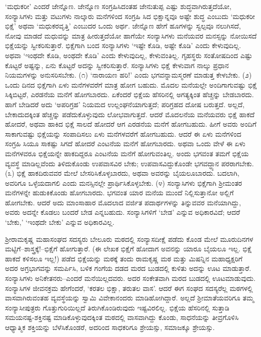‘ಮಧುಕರೀ’ ಎಂದರೆ ಜೇನ್ನೊಣ. ಜೇನ್ನೊಣ ಸಂಗ್ರಹಿಸಿದಂತಹ ಜೇನುತುಪ್ಪ ಎಷ್ಟು ಶುದ್ಧವಾಗಿರುತ್ತದೆಯೋ, ಸಂನ್ಯಾಸಿಗಳು ಮತ್ತು ವಟುಗಳು ನಾಲ್ಕಾರು ಮನೆಗಳಿಂದ ಸಂಗ್ರಹಿ ಸಿದ ಭಿಕ್ಷಾನ್ನವೂ ಅಷ್ಟೇ ಶುದ್ಧ ಎಂಬುದು ‘ಮಧುಕರೀ ಭಿಕ್ಷೆ’ ಅಥವಾ ‘ಮಧುಕರವೃತ್ತಿ’ ಎಂಬುದರ ಒಂದು ಅರ್ಥ. ಜೇನ್ನೊಣ ಹೇಗೆ ಹೂಗಳನ್ನು ಸ್ವಲ್ಪವೂ ನಲುಗಿಸದೆ, ನೋವು ಮಾಡದೆ ಮಧುವನ್ನು ಮಾತ್ರ ಹೀರುತ್ತದೆಯೋ ಹಾಗೆಯೇ ಸಂನ್ಯಾಸಿಗಳು ಮನೆಯವರ ಮನಸ್ಸನ್ನು ನೋಯಿಸದೆ ಭಿಕ್ಷೆಯನ್ನು ಸ್ವೀಕರಿಸುತ್ತಾರೆ. ಭಿಕ್ಷೆಗಾಗಿ ಬಂದ ಸಂನ್ಯಾಸಿಗಳು ‘ಇಷ್ಟೇ ಕೊಡಿ, ಅಷ್ಟೇ ಕೊಡಿ’ ಎಂದು ಕೇಳುವುದಿಲ್ಲ. ಅಥವಾ ‘ಇಂಥದೇ ಕೊಡಿ, ಅಂಥದೇ ಕೊಡಿ’ ಎಂದು ಕೇಳುವುದಿಲ್ಲ, ಕೇಳುವಂತಿಲ್ಲ. ಗೃಹಸ್ಥರು ಸಂತೋಷದಿಂದ ಎಷ್ಟು ಕೊಟ್ಟರೆ ಅಷ್ಟನ್ನು, ಏನು ಕೊಟ್ಟರೆ ಅದನ್ನು ಸ್ವೀಕರಿಸುತ್ತಾರೆ. ಸಂನ್ಯಾಸಿಗಳು ಭಿಕ್ಷೆ ಕೇಳುವಾಗ ನಾಲ್ಕು ಪ್ರಧಾನ ನಿಯಮಗಳನ್ನು ಅನುಸರಿಸಬೇಕು. (೧) ‘ನಾರಾಯಣ ಹರಿ!’ ಎಂದು ಭಗವನ್ನಾಮಸ್ಮರಣೆ ಮಾಡುತ್ತ ಕೇಳಬೇಕು. (೨) ಒಂದು ದಿನದ ಭಿಕ್ಷೆಗಾಗಿ ಏಳು ಮನೆಗಳವರೆಗೆ ಮಾತ್ರ ಹೋಗ ಬಹುದು. ಮೊದಲ ಮನೆಯಲ್ಲೇ ಅಂದಿಗಾಗುವಷ್ಟು ಭಿಕ್ಷೆ ಸಿಕ್ಕಿಬಿಟ್ಟರೆ, ಎರಡನೆಯ ಮನೆಗೆ ಹೋಗಬಾರದು. ಏಕೆಂದರೆ ಭಿಕ್ಷೆಯ ಹೆಸರಿನಲ್ಲಿ ಅಗತ್ಯಕ್ಕಿಂತ ಹೆಚ್ಚನ್ನು ಬೇಡಬಾರದು. ಹಾಗೆ ಬೇಡಿದರೆ ಅದು ‘ಅಪರಿಗ್ರಹ’ ನಿಯಮದ ಉಲ್ಲಂಘನೆಯಾಗುತ್ತದೆ; ಪರಿಗ್ರಹದ ದೋಷ ಬರುತ್ತದೆ. ಅಲ್ಲದೆ, ಬೇಕಾದುದಕ್ಕಿಂತ ಹೆಚ್ಚನ್ನು ಪಡೆದುಕೊಳ್ಳುವುದು ಲೋಭವಾಗುತ್ತದೆ. ಆದರೆ ಮೊದಲನೆಯ ಮನೆಯವರು ಭಿಕ್ಷೆ ಹಾಕದೆ ಹೋದರೆ, ಅಥವಾ ಹಾಕಿದ ಭಿಕ್ಷೆ ಸಾಲದೆ ಹೋದರೆ ಆಗ ಎರಡನೆಯ ಮನೆಗೆ ಹೋಗಬಹುದು. ಹೀಗೆ ಅವರು ಅಂದಿಗೆ ಸಾಕಾಗುವಷ್ಟು ಭಿಕ್ಷೆಯನ್ನು ಸಂಪಾದಿಸಲು ಏಳು ಮನೆಗಳವರೆಗೆ ಹೋಗಬಹುದು. ಆದರೆ ಈ ಏಳು ಮನೆಗಳಿಂದ ಸಂಗ್ರಹಿ ಸಿಯೂ ಸಾಕಷ್ಟು ಸಿಗದೆ ಹೋದರೆ ಎಂಟನೆಯ ಮನೆಗೆ ಹೋಗಬಾರದು. ಅಥವಾ ಒಂದು ವೇಳೆ ಈ ಏಳು ಮನೆಗಳವರೂ ಭಿಕ್ಷೆಯನ್ನೇ ಹಾಕದಿದ್ದರೂ ಎಂಟನೆಯ ಮನೆಗೆ ಹೋಗುವಂತಿಲ್ಲ. ಅಂದು ಭಗವಂತ ತಮಗೆ ಭಿಕ್ಷೆಯ ವ್ಯವಸ್ಥೆ ಮಾಡಿಲ್ಲವೆಂದು ತಿಳಿದುಕೊಂಡು ಉಪವಾಸವಿರ ಬೇಕು; ಉಪವಾಸವಿದ್ದುಕೊಂಡೇ ಭಗವದ್ಧ್ಯಾನ ಪರರಾಗಬೇಕು. (೩) ಭಿಕ್ಷೆ ಹಾಕದಿರುವವರ ಮೇಲೆ ಬೇಸರಿಸಿಕೊಳ್ಳಬಾರದು, ಅಥವಾ ಅವರನ್ನು ಬೈಯಲೂಬಾರದು. ಬದಲಾಗಿ, ಅವರಿಗೂ ಒಳ್ಳೆಯದಾಗಲಿ ಎಂದು ಮನಸ್ಸಿನಲ್ಲೇ ಪ್ರಾರ್ಥಿಸಿಕೊಳ್ಳಬೇಕು. (೪) ಸಂನ್ಯಾಸಿಗಳು ಭಿಕ್ಷೆಗಾಗಿ ಶ್ರೀಮಂತರ ಮನೆಗಳನ್ನೇ ಹುಡುಕಿಕೊಂಡು ಹೋಗಬಾರದು. ಭಗವಂತ ಯಾರ ಮನೆಯ ಮುಂದೆ ನಿಲ್ಲಿಸುತ್ತಾನೋ ಅಲ್ಲಿಗೆ ಹೋಗಬೇಕು. ಆದರೆ ಅದು ಮಾಂಸಾಹಾರ ಮೊದಲಾದ ವರ್ಜಿತ ಪದಾರ್ಥಗಳನ್ನು ತಿನ್ನುವವರ ಮನೆಯಾಗಿದ್ದು, ಅವರು ಅದನ್ನೇ ಕೊಡಲು ಬಂದರೆ ಬೇಡ ಎನ್ನಬಹುದು. ಸಂನ್ಯಾಸಿಗಳಿಗೆ ‘ಬೇಡ’ ಎನ್ನುವ ಅಧಿಕಾರವಿದೆ; ಆದರೆ ‘ಬೇಕು,’ ‘ಇಂಥದೇ ಬೇಕು’ ಎನ್ನುವ ಅಧಿಕಾರವಿಲ್ಲ.

ಶ್ರೀರಾಮಕೃಷ್ಣ ಮಹಾಸಂಘದ ಸದಸ್ಯರು ಬೇಲೂರು ಮಠದಲ್ಲಿ ಸಂನ್ಯಾಸದೀಕ್ಷೆ ಪಡೆದು ಕೊಂಡ ಮೇಲೆ ಮೂರುದಿನಗಳ ಮಟ್ಟಿಗೆ–ಶಾಸ್ತ್ರಕ್ಕೆ!–ಭಿಕ್ಷೆಗೆ ಹೋಗುತ್ತಾರೆ. (ಈ ಲೇಖಕ ಭಿಕ್ಷೆಗೆ ಹೋದಾಗ ಅವನನ್ನು ಯಾರೂ ಬೈಯಲೂ ಇಲ್ಲ. ಭಿಕ್ಷೆ ಹಾಕದೆ ಕಳಿಸಲೂ ಇಲ್ಲ!) ಪಡೆದ ಭಿಕ್ಷೆಯನ್ನು ಮಠಕ್ಕೆ ತಂದು ರಾಮಕೃಷ್ಣ ಮಠ ಮತ್ತು ಮಿಷನ್ನಿನ ಮಹಾಧ್ಯಕ್ಷರಿಗೆ ಅದರ ಅಗ್ರಭಾಗವನ್ನು ಸಮರ್ಪಿಸಿ, ಬಳಿಕ ಗಂಗೆಯ ದಡದ ಮರದ ಬುಡದಲ್ಲಿ ಕುಳಿತು ಅದನ್ನು ಊಟ ಮಾಡುತ್ತಾರೆ. ಸಂನ್ಯಾಸಿಗಳು ಅನಿಕೇತನರು–ಎಂದರೆ ಮನೆಯಿಲ್ಲದವರು. ಅದರ ಸಂಕೇತವಾಗಿ ಮರದ ಬುಡದಲ್ಲಿ ಊಟಮಾಡುವುದು. ಸಂನ್ಯಾಸಿಗಳ ಜೀವನಕ್ರಮ ಹೇಗೆಂದರೆ, ‘ಕರತಲ ಭಿಕ್ಷಾ, ತರುತಲ ವಾಸ’. ಆದರೆ ಈಗ ಸಂಘದ ಸದಸ್ಯರೆಲ್ಲ ಮಠಗಳಲ್ಲಿ ವಾಸವಾಗಿರುವಂತಹ ವ್ಯವಸ್ಥೆಯನ್ನು ಸ್ವಾಮಿ ವಿವೇಕಾನಂದರು ಮಾಡಿಹೋಗಿದ್ದಾರೆ. ಅಲ್ಲದೆ ಶ್ರೀಮಾತೆಯವರಿಗೂ ತಮ್ಮ ಸಂನ್ಯಾಸೀಪುತ್ರರು ಗೊತ್ತುಗುರಿಯಿಲ್ಲದೆ ತಿರುಗಿಕೊಂಡಿರುವುದು ಇಷ್ಟವಿರಲಿಲ್ಲ. ಭಿಕ್ಷೆಯ ಹೆಸರಿನಲ್ಲಿ ಸುತ್ತಾಡಿ ಸಮಯನಷ್ಟ-ಶಕ್ತಿನಷ್ಟ ಮಾಡಿಕೊಳ್ಳುವುದಕ್ಕಿಂತ ಮಠದಲ್ಲಿ ವಾಸವಾಗಿದ್ದು ಕೊಂಡು, ಸಾಧನೆಯನ್ನು ತೀವ್ರಗೊಳಿಸಿ ಆಧ್ಯಾತ್ಮಿಕ ಶಕ್ತಿಯನ್ನು ಬೆಳೆಸಿಕೊಂಡರೆ, ಅದರಿಂದ ಸಾಧಕರಿಗೂ ಶ್ರೇಯಸ್ಸು, ಸಮಾಜಕ್ಕೂ ಶ್ರೇಯಸ್ಸು.



